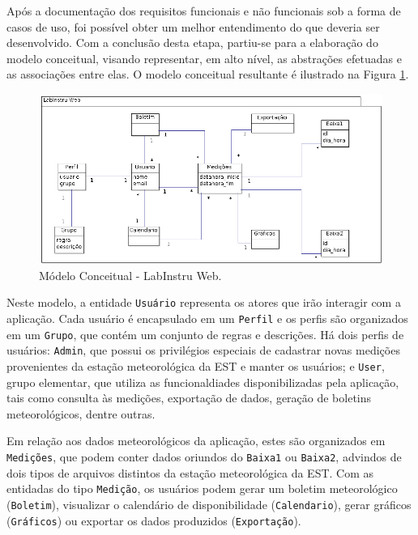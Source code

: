 Após a documentação dos requisitos funcionais e não funcionais sob a forma de casos de uso, foi possível obter um melhor entendimento do que deveria ser desenvolvido. Com a conclusão desta etapa, partiu-se para a elaboração do modelo conceitual, visando representar, em alto nível, as abstrações efetuadas e as associações entre elas. O modelo conceitual resultante é ilustrado na Figura \ref{fig:modeloConceitual}.

\begin{figure}[H]
	\centering
	\includegraphics[scale=0.8]{img/ModeloConceitual.png}
	\caption{Módelo Conceitual - LabInstru Web.}
	\label{fig:modeloConceitual}
\end{figure}

Neste modelo, a entidade \texttt{Usuário} representa os atores que irão interagir com a aplicação. Cada usuário é encapsulado em um \texttt{Perfil} e os perfis são organizados em um \texttt{Grupo}, que contém um conjunto de regras e descrições. Há dois perfis de usuários: \texttt{Admin}, que possui os privilégios especiais de cadastrar novas medições provenientes da estação meteorológica da EST e manter os usuários; e \texttt{User}, grupo elementar, que utiliza as funcionaldiades disponibilizadas pela aplicação, tais como consulta às medições, exportação de dados, geração de boletins meteorológicos, dentre outras.

Em relação aos dados meteorológicos da aplicação, estes são organizados em \texttt{Medições}, que podem conter dados oriundos do \texttt{Baixa1} ou \texttt{Baixa2}, advindos de dois tipos de arquivos distintos da estação meteorológica da EST. Com as entidadas do tipo \texttt{Medição}, os usuários podem gerar um boletim meteorológico (\texttt{Boletim}), visualizar o calendário de disponibilidade (\texttt{Calendario}), gerar gráficos (\texttt{Gráficos}) ou exportar os dados produzidos (\texttt{Exportação}).

